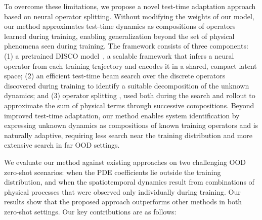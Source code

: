 \documentclass{article}
\newcommand{\jh}[1] {\textcolor{cyan}{[JH. #1]}}
\theoremstyle{plain}
\theoremstyle{definition}
\theoremstyle{remark}
\begin{document}
To overcome these limitations, we propose a novel test-time adaptation approach based on neural operator splitting. Without modifying the weights of our model, our method approximates test-time dynamics as compositions of operators learned during training, enabling generalization beyond the set of physical phenomena seen during training.
The framework consists of three components: 
(1) a pretrained DISCO model~\citep{morel2025disco}, a scalable framework that infers a neural operator from each training trajectory and encodes it in a shared, compact latent space;
(2) an efficient test-time beam search over the discrete operators discovered during training to identify a suitable decomposition of the unknown dynamics; 
and (3) operator splitting \citep{Strang1968OnTC}, used both during the search and rollout to approximate the sum of physical terms through successive compositions.
Beyond improved test-time adaptation, our method enables system identification by expressing unknown dynamics as compositions of known training operators and is naturally adaptive, requiring less search near the training distribution and more extensive search in far OOD settings.

We evaluate our method against existing approaches on two challenging OOD zero-shot scenarios: when the PDE coefficients lie outside the training distribution, and when the spatiotemporal dynamics result from combinations of physical processes that were observed only individually during training.
Our results show that the proposed approach outperforms other methods in both zero-shot settings. 
Our key contributions are as follows:
\end{document}
